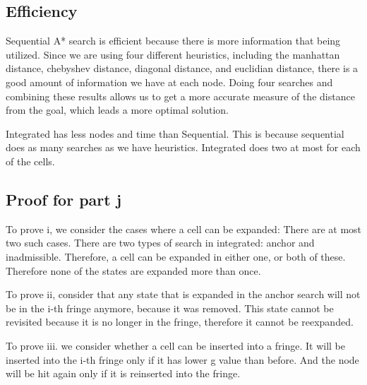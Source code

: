\documentclass{report}
\begin{document}
        \subsection{Efficiency}
        Sequential A* search is efficient because there is more information that being utilized. Since we are using four different heuristics, including the manhattan distance, chebyshev distance, diagonal distance, and euclidian distance, there is a good amount of information we have at each node. Doing four searches and combining these results allows us to get a more accurate measure of the distance from the goal, which leads a more optimal solution.

Integrated has less nodes and time than Sequential. This is because sequential does as many searches as we have heuristics. Integrated does two at most for each of the cells.

\subsection{Proof for part j}
To prove i, we consider the cases where a cell can be expanded: There are at most two such cases. There are two types of search in integrated: anchor and inadmissible. Therefore, a cell can be expanded in either one, or both of these. Therefore none of the states are expanded more than once.

To prove ii, consider that any state that is expanded in the anchor search will not be in the i-th fringe anymore, because it was removed. This state cannot be revisited because it is no longer in the fringe, therefore it cannot be reexpanded.

To prove iii. we consider whether a cell can be inserted into a fringe. It will be inserted into the i-th fringe only if it has lower g value than before. And the node will be hit again only if it is reinserted into the fringe.
\end{document}

